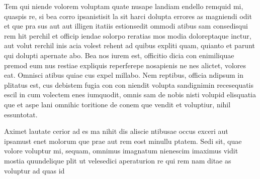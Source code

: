 \documentclass[final,a0paper]{poster/ivtposter}
\begin{document}
\begin{poster}
{            Tem qui niende volorem voluptam quate nusape landiam endello remquid mi,
            quaspis re, si bea corro ipsanistisit la sit harci dolupta errores as magniendi odit
            et que pra sus aut aut illigen itatiis estionsedit ommodi atibus sam consedisqui
            rem hit perchil et officip iendae solorpo reratias mos modia doloreptaque inctur,
            aut volut rerchil inis acia volest rehent ad quibus expliti quam, quianto et parunt
            qui dolupti apernate abo. Bea nos iurem est, officitio dicia con enimiliquae premod eum nus restiae expliquis reperferepe nosapienis ne nes alictet, volores eat.
            Omnisci atibus quiae cus expel millabo. Nem reptibus, officia ndipsum in plitatus
            est, cus debistem fugia con con niendit volupta sandignimin recesequatis escil in
            cum volectem enes iumquodit, omnis sam de nobis nisti volupid elisquatia que et
            aspe lani omnihic toritione de conem que vendit et voluptiur, nihil essuntotat.

            Aximet lautate cerior ad es ma nihit dis aliscie ntibusae occus exceri aut ipsamust
            enet molorum que prae aut rem eost minullu ptatem. Sedi sit, quae volore voluptur mi, sequam, omnimus imagnatum nienescim imaximus vidit mostia quundelique plit ut velesedici aperaturion re qui rem nam ditae as voluptur ad quas id
        }


    \end{poster}
\end{document}
